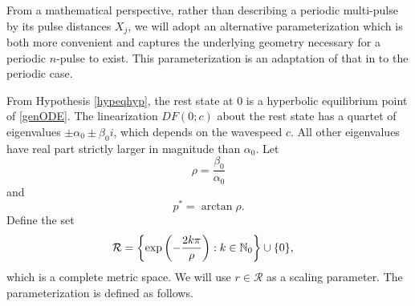 \documentclass[11pt,reqno]{amsart}
\theoremstyle{plain}
\theoremstyle{definition}
\theoremstyle{remark}
\begin{document}
From a mathematical perspective, rather than describing a periodic multi-pulse by its pulse distances $X_j$, we will adopt an alternative parameterization which is both more convenient and captures the underlying geometry necessary for a periodic $n$-pulse to exist. This parameterization is an adaptation of that in \cite{SandstedeStrut,Sandstede1998} to the periodic case. 

From Hypothesis \ref{hypeqhyp}, the rest state at 0 is a hyperbolic equilibrium point of \cref{genODE}. The linearization $DF(0; c)$ about the rest state has a quartet of eigenvalues $\pm \alpha_0 \pm \beta_0 i$, which depends on the wavespeed $c$. All other eigenvalues have real part strictly larger in magnitude than $\alpha_0$. Let
\begin{equation}\label{defrho}
\rho = \frac{\beta_0}{\alpha_0}
\end{equation}
and
\begin{equation}\label{pstar}
p^* = \arctan \rho.
\end{equation}
Define the set
\begin{align}
\mathcal{R} &= \left\{ \mathop\mathrm{exp}\nolimits\left(-\frac{2 k \pi}{\rho}\right) : k \in \mathbb{N}_0 \right\} \cup \{ 0 \},
\end{align}
which is a complete metric space. We will use $r \in \mathcal{R}$ as a scaling parameter. The parameterization is defined as follows.
\end{document}
